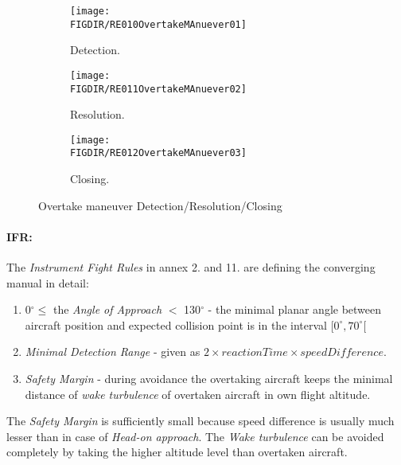 \begin{figure}[H]
	\centering
    \begin{subfigure}{0.32\textwidth}
        \texttt{[image: \\FIGDIR/RE010OvertakeMAnuever01]} 
        \caption{Detection.}
        \label{fig:OvertakeManeuverTheoreticalDetection}
    \end{subfigure}
    \begin{subfigure}{0.32\textwidth}
        \texttt{[image: \\FIGDIR/RE011OvertakeMAnuever02]} 
        \caption{Resolution.}
        \label{fig:OvertakeManeuverTheoreticalResolution}
    \end{subfigure}
    \begin{subfigure}{0.32\textwidth}
        \texttt{[image: \\FIGDIR/RE012OvertakeMAnuever03]} 
        \caption{Closing.}
        \label{fig:OvertakeManeuverTheoreticalClosure}
    \end{subfigure}
    \caption{Overtake maneuver Detection/Resolution/Closing}
    \label{fig:OvertakeManeuverTheoretical}
\end{figure}

\paragraph{IFR:} The \emph{Instrument Fight Rules} in annex 2. \cite{icaoAnnex2} and 11. \cite{icaoAnnex11} are defining the converging manual in detail:

\begin{enumerate}
    \item 0$^\circ \le$ the \emph{Angle of Approach} $<$ 130$^\circ$ - the minimal planar angle between aircraft position and expected collision point is in the interval $[0^\circ,70^\circ[$
    
    \item \emph{Minimal Detection Range} - given as $2 \times  reaction Time \times speed Difference$. 
    
    \item \emph{Safety Margin} - during avoidance the overtaking aircraft keeps the minimal distance of \emph{wake turbulence} of overtaken aircraft in own flight altitude. 
\end{enumerate}

\begin{note}
    The \emph{Safety Margin} is sufficiently small because speed difference is usually much lesser than in case of  \emph{Head-on approach}. The \emph{Wake turbulence} can be avoided completely by taking the higher altitude level than overtaken aircraft.
\end{note}


